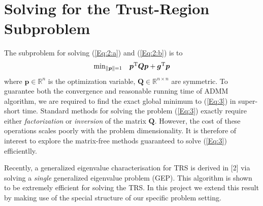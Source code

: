 \section{Solving for the Trust-Region Subproblem}
The subproblem for solving (\ref{Eq:2:a}) and (\ref{Eq:2:b}) is to
\begin{equation}\label{Eq:3}
\begin{array}{ll}
\min_{\|\bm p\|=1}&\bm p^{\mathrm T}\bm Q\bm p+\bm g^{\mathrm T}\bm p
\end{array}
\end{equation}
where $\bm p\in\mathbb{R}^n$ is the optimization variable, $\bm Q\in\mathbb{R}^{n\times n}$ are symmetric. To guarantee both the convergence and reasonable running time of ADMM algorithm, we are required to find the exact global minimum to (\ref{Eq:3}) in super-short time. Standard methods for solving the problem (\ref{Eq:3}) exactly require either \emph{factorization} or \emph{inversion} of the matrix $\bm Q$. However, the cost of these operations scales poorly with the problem dimensionality. It is therefore of interest to explore the matrix-free methods guaranteed to solve (\ref{Eq:3}) efficientlly.

Recently, a generalized eigenvalue characterisation for TRS is derived in [2] via solving a \emph{single} generalized eigenvalue problem (GEP). This algorithm is shown to be extremely efficient for solving the TRS. In this project we extend this result by making use of the special structure of our specific problem setting.

